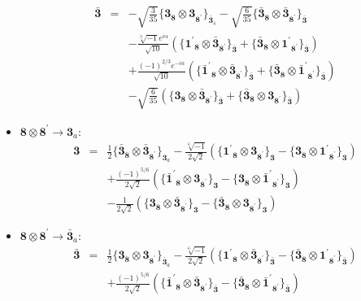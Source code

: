 \documentclass[english]{article}
\newcommand{\subcg}[3]{\big\{ {#1}\otimes{#2}\big\}^{}_{#3}}
\newcommand{\rep}[1]{\mathbf{#1}}
\begin{document}
\begin{itemize}
\begin{eqnarray*}
\\
\rep{\bar{3}} &=& -\sqrt{\frac{3}{35}}\subcg{\rep{3}_{\rep{8}}}{\rep{3}_{\rep{8^{\prime}}}}{\rep{\bar{3}}_{s}}-\sqrt{\frac{6}{35}}\subcg{\rep{\bar{3}}_{\rep{8}}}{\rep{\bar{3}}_{\rep{8^{\prime}}}}{\rep{\bar{3}}} \\ 
 & & -\frac{\sqrt[3]{-1} e^{i \alpha }}{\sqrt{10}}\left(\subcg{\rep{1^{\prime}}_{\rep{8}}}{\rep{\bar{3}}_{\rep{8^{\prime}}}}{\rep{\bar{3}}}+\subcg{\rep{\bar{3}}_{\rep{8}}}{\rep{1^{\prime}}_{\rep{8^{\prime}}}}{\rep{\bar{3}}}\right) \\ 
 & & +\frac{(-1)^{2/3} e^{-i \alpha }}{\sqrt{10}}\left(\subcg{\rep{\bar{1}^{\prime}}_{\rep{8}}}{\rep{\bar{3}}_{\rep{8^{\prime}}}}{\rep{\bar{3}}}+\subcg{\rep{\bar{3}}_{\rep{8}}}{\rep{\bar{1}^{\prime}}_{\rep{8^{\prime}}}}{\rep{\bar{3}}}\right) \\ 
 & & -\sqrt{\frac{6}{35}}\left(\subcg{\rep{3}_{\rep{8}}}{\rep{\bar{3}}_{\rep{8^{\prime}}}}{\rep{\bar{3}}}+\subcg{\rep{\bar{3}}_{\rep{8}}}{\rep{3}_{\rep{8^{\prime}}}}{\rep{\bar{3}}}\right)
\end{eqnarray*}
\item $\rep{8}\otimes\rep{8^{\prime}}\to\rep{3}_{a}$:
\begin{eqnarray*}
\rep{3} &=& \frac{1}{2}\subcg{\rep{\bar{3}}_{\rep{8}}}{\rep{\bar{3}}_{\rep{8^{\prime}}}}{\rep{3}_{a}}-\frac{\sqrt[6]{-1}}{2 \sqrt{2}}\left(\subcg{\rep{1^{\prime}}_{\rep{8}}}{\rep{3}_{\rep{8^{\prime}}}}{\rep{3}}-\subcg{\rep{3}_{\rep{8}}}{\rep{1^{\prime}}_{\rep{8^{\prime}}}}{\rep{3}}\right) \\ 
 & & +\frac{(-1)^{5/6}}{2 \sqrt{2}}\left(\subcg{\rep{\bar{1}^{\prime}}_{\rep{8}}}{\rep{3}_{\rep{8^{\prime}}}}{\rep{3}}-\subcg{\rep{3}_{\rep{8}}}{\rep{\bar{1}^{\prime}}_{\rep{8^{\prime}}}}{\rep{3}}\right) \\ 
 & & -\frac{1}{2 \sqrt{2}}\left(\subcg{\rep{3}_{\rep{8}}}{\rep{\bar{3}}_{\rep{8^{\prime}}}}{\rep{3}}-\subcg{\rep{\bar{3}}_{\rep{8}}}{\rep{3}_{\rep{8^{\prime}}}}{\rep{3}}\right)
\end{eqnarray*}
\item $\rep{8}\otimes\rep{8^{\prime}}\to\rep{\bar{3}}_{a}$:
\begin{eqnarray*}
\rep{\bar{3}} &=& \frac{1}{2}\subcg{\rep{3}_{\rep{8}}}{\rep{3}_{\rep{8^{\prime}}}}{\rep{\bar{3}}_{a}}-\frac{\sqrt[6]{-1}}{2 \sqrt{2}}\left(\subcg{\rep{1^{\prime}}_{\rep{8}}}{\rep{\bar{3}}_{\rep{8^{\prime}}}}{\rep{\bar{3}}}-\subcg{\rep{\bar{3}}_{\rep{8}}}{\rep{1^{\prime}}_{\rep{8^{\prime}}}}{\rep{\bar{3}}}\right) \\ 
 & & +\frac{(-1)^{5/6}}{2 \sqrt{2}}\left(\subcg{\rep{\bar{1}^{\prime}}_{\rep{8}}}{\rep{\bar{3}}_{\rep{8^{\prime}}}}{\rep{\bar{3}}}-\subcg{\rep{\bar{3}}_{\rep{8}}}{\rep{\bar{1}^{\prime}}_{\rep{8^{\prime}}}}{\rep{\bar{3}}}\right) \\ 

\end{eqnarray*}
\end{itemize}
\end{document}
